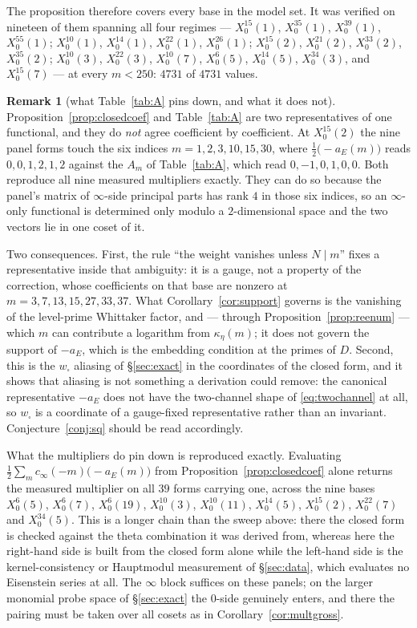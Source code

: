 \documentclass[11pt,reqno]{amsart}
\theoremstyle{plain}
\theoremstyle{definition}
\newtheorem{remark}[theorem]{Remark}
\begin{document}
The proposition therefore covers every base in the model set. It was verified on nineteen
of them spanning all four regimes --- $X_0^{15}(1)$, $X_0^{35}(1)$, $X_0^{39}(1)$,
$X_0^{55}(1)$; $X_0^{10}(1)$, $X_0^{14}(1)$, $X_0^{22}(1)$, $X_0^{26}(1)$; $X_0^{15}(2)$,
$X_0^{21}(2)$, $X_0^{33}(2)$, $X_0^{35}(2)$; $X_0^{10}(3)$, $X_0^{22}(3)$, $X_0^{10}(7)$,
$X_0^{6}(5)$, $X_0^{14}(5)$, $X_0^{34}(3)$, and $X_0^{15}(7)$ --- at every $m<250$: $4731$
of $4731$ values.

\begin{remark}[what Table~\ref{tab:A} pins down, and what it does not]\label{rem:gauge}
Proposition~\ref{prop:closedcoef} and Table~\ref{tab:A} are two representatives of one
functional, and they do \emph{not} agree coefficient by coefficient. At $X_0^{15}(2)$ the nine
panel forms touch the six indices $m=1,2,3,10,15,30$, where $\tfrac12\bigl(-a_E(m)\bigr)$
reads $0,0,1,2,1,2$ against the $A_m$ of Table~\ref{tab:A}, which read $0,-1,0,1,0,0$. Both
reproduce all nine measured multipliers exactly. They can do so because the panel's matrix of
$\infty$-side principal parts has rank $4$ in those six indices, so an $\infty$-only functional
is determined only modulo a $2$-dimensional space and the two vectors lie in one coset of it.

Two consequences. First, the rule ``the weight vanishes unless $N\mid m$'' fixes a
representative inside that ambiguity: it is a gauge, not a property of the correction, whose
coefficients on that base are nonzero at $m=3,7,13,15,27,33,37$. What
Corollary~\ref{cor:support} governs is the vanishing of the level-prime Whittaker factor, and
--- through Proposition~\ref{prop:reenum} --- which $m$ can contribute a logarithm from
$\kappa_\eta(m)$; it does not govern the support of $-a_E$, which is the embedding condition at
the primes of $D$. Second, this is the $w_\square$ aliasing of \S\ref{sec:exact} in the
coordinates of the closed form, and it shows that aliasing is not something a derivation could
remove: the canonical representative $-a_E$ does not have the two-channel shape of
\eqref{eq:twochannel} at all, so $w_\square$ is a coordinate of a gauge-fixed representative
rather than an invariant. Conjecture~\ref{conj:sq} should be read accordingly.

What the multipliers do pin down is reproduced exactly. Evaluating
$\tfrac12\sum_m c_\infty(-m)\bigl(-a_E(m)\bigr)$ from Proposition~\ref{prop:closedcoef} alone
returns the measured multiplier on all $39$ forms carrying one, across the nine bases
$X_0^{6}(5)$, $X_0^{6}(7)$, $X_0^{6}(19)$, $X_0^{10}(3)$, $X_0^{10}(11)$, $X_0^{14}(5)$,
$X_0^{15}(2)$, $X_0^{22}(7)$ and $X_0^{34}(5)$. This is a longer chain than the sweep above:
there the closed form is checked against the theta combination it was derived from, whereas
here the right-hand side is built from the closed form alone while the left-hand side is the
kernel-consistency or Hauptmodul measurement of \S\ref{sec:data}, which evaluates no Eisenstein
series at all. The $\infty$ block suffices on these panels; on the larger monomial probe space
of \S\ref{sec:exact} the $0$-side genuinely enters, and there the pairing must be taken over all
cosets as in Corollary~\ref{cor:multgross}.
\end{remark}
\end{document}
